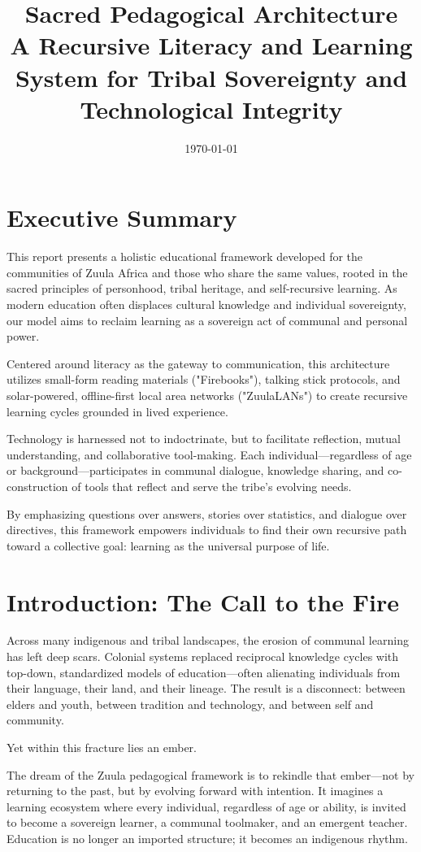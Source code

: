 \documentclass[12pt]{article}
\title{\textbf{Sacred Pedagogical Architecture} \\ \large A Recursive Literacy and Learning System for Tribal Sovereignty and Technological Integrity}
\author{}
\date{\today}
\begin{document}
\maketitle

\section*{Executive Summary}
This report presents a holistic educational framework developed for the communities of Zuula Africa and those who share the same values, rooted in the sacred principles of personhood, tribal heritage, and self-recursive learning. As modern education often displaces cultural knowledge and individual sovereignty, our model aims to reclaim learning as a sovereign act of communal and personal power.

Centered around literacy as the gateway to communication, this architecture utilizes small-form reading materials ("Firebooks"), talking stick protocols, and solar-powered, offline-first local area networks ("ZuulaLANs") to create recursive learning cycles grounded in lived experience.

Technology is harnessed not to indoctrinate, but to facilitate reflection, mutual understanding, and collaborative tool-making. Each individual—regardless of age or background—participates in communal dialogue, knowledge sharing, and co-construction of tools that reflect and serve the tribe's evolving needs.

By emphasizing questions over answers, stories over statistics, and dialogue over directives, this framework empowers individuals to find their own recursive path toward a collective goal: learning as the universal purpose of life.


\section*{Introduction: The Call to the Fire}

Across many indigenous and tribal landscapes, the erosion of communal learning has left deep scars. Colonial systems replaced reciprocal knowledge cycles with top-down, standardized models of education—often alienating individuals from their language, their land, and their lineage. The result is a disconnect: between elders and youth, between tradition and technology, and between self and community.

Yet within this fracture lies an ember.

The dream of the Zuula pedagogical framework is to rekindle that ember—not by returning to the past, but by evolving forward with intention. It imagines a learning ecosystem where every individual, regardless of age or ability, is invited to become a sovereign learner, a communal toolmaker, and an emergent teacher. Education is no longer an imported structure; it becomes an indigenous rhythm.
\end{document}
